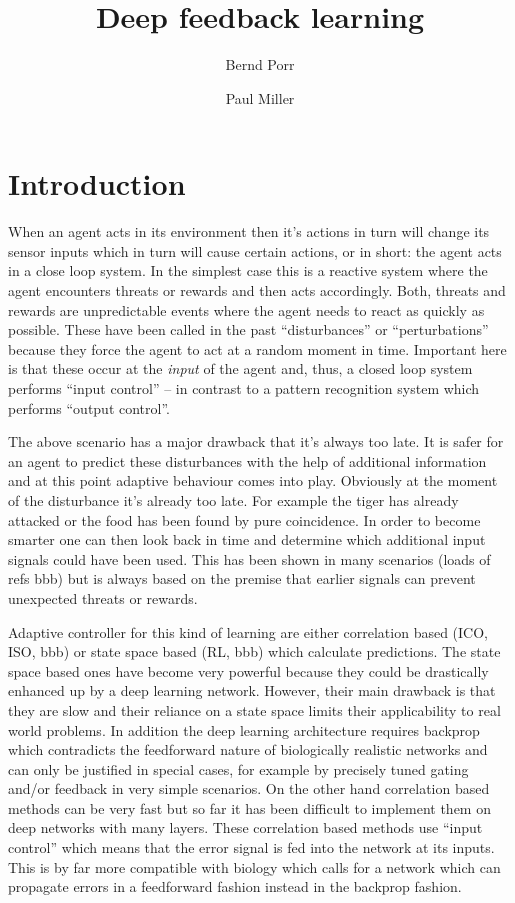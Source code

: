 \documentclass{llncs}
\title{Deep feedback learning}
\author{Bernd Porr \and Paul Miller}
\institute{Glasgow Neuro, bernd,paul@glasgowneuro.tech}
\begin{document}
\maketitle

\begin{abstract}
\end{abstract}

\section{Introduction}
When an agent acts in its environment then it's actions in turn will
change its sensor inputs which in turn will cause certain actions, or in
short: the agent acts in a close loop system. In the simplest case this
is a reactive system where the agent encounters threats or rewards and
then acts accordingly. Both, threats and rewards are unpredictable events
where the agent needs to react as quickly as possible. These have been
called in the past ``disturbances'' or ``perturbations'' because they force
the agent to act at a random moment in time. Important here is that these
occur at the \textsl{input} of the agent and, thus, a closed loop system
performs ``input control'' -- in contrast to a pattern recognition system
which performs ``output control''.

The above scenario has a major drawback that it's always too late.
It is safer for an agent to predict these disturbances with
the help of additional information and at this point adaptive behaviour comes
into play. Obviously at the moment of the disturbance it's already too late.
For example the tiger has already attacked or the food has been found by
pure coincidence. In order to become smarter one can then look back in time
and determine which additional input signals could have been used. This has been
shown in many scenarios (loads of refs bbb) but is always based on the premise
that earlier signals can prevent unexpected threats or rewards.

Adaptive controller for this kind of learning are either correlation based (ICO, ISO, bbb)
or state space based (RL, bbb) which calculate predictions. The state space based
ones have become very powerful because they could be drastically enhanced
up by a deep learning network. However, their main drawback is that they are slow
and their reliance on a state space limits their applicability to real
world problems. In addition the deep learning architecture requires backprop
which contradicts the feedforward nature of biologically realistic networks
and can only be justified in special cases, for example by precisely tuned gating and/or
feedback in very simple scenarios. On the other hand correlation based methods can be very fast but
so far it has been difficult to implement them on deep networks with many layers.
These correlation based methods use ``input control'' which means that the
error signal is fed into the network at its inputs. This is by far more compatible
with biology which calls for a network which can propagate errors in a feedforward
fashion instead in the backprop fashion.
\end{document}
